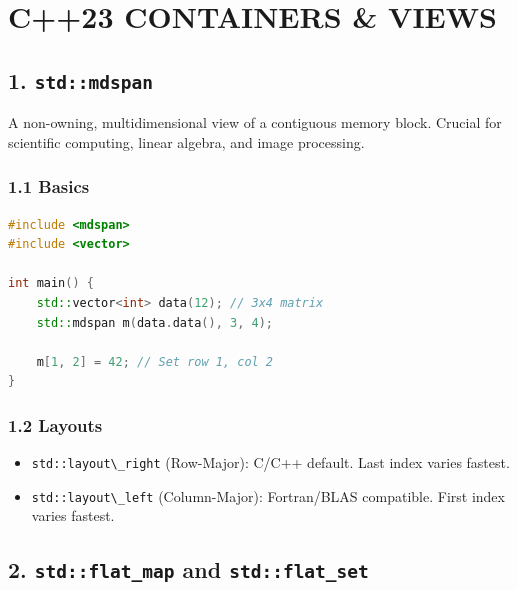 \hypertarget{c23-containers-views}{%
\chapter{C++23 CONTAINERS \& VIEWS}\label{c23-containers-views}}

\hypertarget{stdmdspan}{%
\section{\texorpdfstring{1.
\texttt{std::mdspan}}{1. std::mdspan}}\label{stdmdspan}}

A non-owning, multidimensional view of a contiguous memory block.
Crucial for scientific computing, linear algebra, and image processing.

\hypertarget{basics}{%
\subsection{1.1 Basics}\label{basics}}

\begin{lstlisting}[language={C++}]
#include <mdspan>
#include <vector>

int main() {
    std::vector<int> data(12); // 3x4 matrix
    std::mdspan m(data.data(), 3, 4);
    
    m[1, 2] = 42; // Set row 1, col 2
}
\end{lstlisting}

\hypertarget{layouts}{%
\subsection{1.2 Layouts}\label{layouts}}

\begin{itemize}
\tightlist
\item
  \passthrough{\lstinline!std::layout\_right!} (Row-Major): C/C++
  default. Last index varies fastest.
\item
  \passthrough{\lstinline!std::layout\_left!} (Column-Major):
  Fortran/BLAS compatible. First index varies fastest.
\end{itemize}

\hypertarget{stdflat_map-and-stdflat_set}{%
\section{\texorpdfstring{2. \texttt{std::flat\_map} and
\texttt{std::flat\_set}}{2. std::flat\_map and std::flat\_set}}\label{stdflat_map-and-stdflat_set}}


